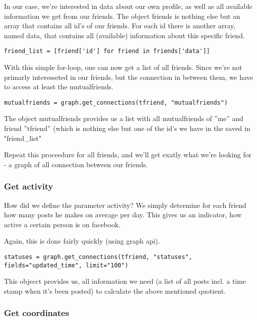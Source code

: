 In our case, we're interested in data about our own profile, as well as all available information we get from our friends.
The object friends is nothing else but an array that contains all id's of our friends. For each id there is another array, named data, that contains all (available) information about this specific friend.  

\begin{lstlisting}
friend_list = [friend['id'] for friend in friends['data']]
\end{lstlisting}

With this simple for-loop, one can now get a list of all friends. Since we're not primarly interesseted in our friends, but the connection in between them, we have to access at least the mutualfriends. 

\begin{lstlisting}
mutualfriends = graph.get_connections(tfriend, "mutualfriends")
\end{lstlisting}

The object mutualfriends provides us a list with all mutualfriends of ''me'' and friend ''tfriend'' (which is nothing else but one of the id's we have in the saved in "friend\_list"

Repeat this proceedure for all friends, and we'll get exatly what we're looking for - a graph of all connection between our friends.

\subsubsection{Get activity}

How did we define the parameter activity? We simply determine for each friend how many posts he makes on average per day. This gives us an indicator, how active a certain person is on facebook. 

Again, this is done fairly quickly (using graph api).

\begin{lstlisting}
statuses = graph.get_connections(tfriend, "statuses", fields="updated_time", limit="100")
\end{lstlisting}

This objecct provides us, all information we need (a list of all posts incl. a time stamp when it's been posted) to calculate the above mentioned quotient.

\subsubsection{Get coordinates}


